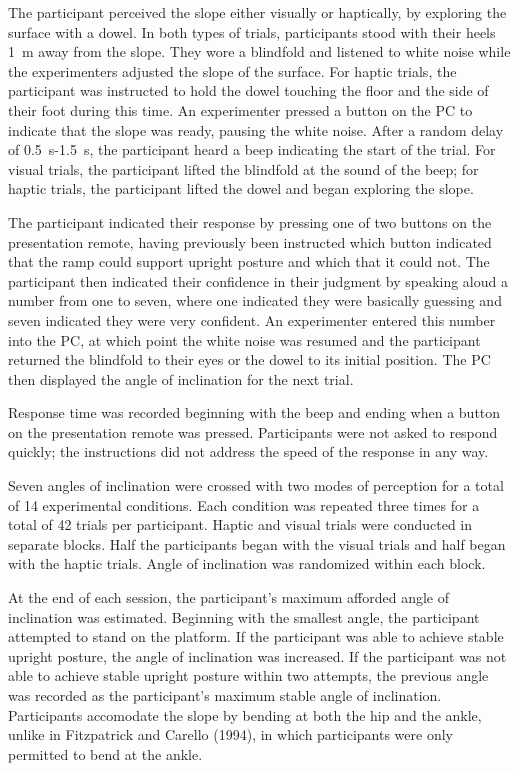 \documentclass{article}
\begin{document}
The participant perceived the slope either visually or haptically, by exploring the surface with a dowel. In both types of trials, participants stood with their heels 1~m away from the slope. They wore a blindfold and listened to white noise while the experimenters adjusted the slope of the surface. For haptic trials, the participant was instructed to hold the dowel touching the floor and the side of their foot during this time. An experimenter pressed a button on the PC to indicate that the slope was ready, pausing the white noise. After a random delay of 0.5~s-1.5~s, the participant heard a beep indicating the start of the trial. For visual trials, the participant lifted the blindfold at the sound of the beep; for haptic trials, the participant lifted the dowel and began exploring the slope.

The participant indicated their response by pressing one of two buttons on the presentation remote, having previously been instructed which button indicated that the ramp could support upright posture and which that it could not. The participant then indicated their confidence in their judgment by speaking aloud a number from one to seven, where one indicated they were basically guessing and seven indicated they were very confident. An experimenter entered this number into the PC, at which point the white noise was resumed and the participant returned the blindfold to their eyes or the dowel to its initial position. The PC then displayed the angle of inclination for the next trial.

Response time was recorded beginning with the beep and ending when a button on the presentation remote was pressed. Participants were not asked to respond quickly; the instructions did not address the speed of the response in any way.

Seven angles of inclination were crossed with two modes of perception for a total of 14 experimental conditions. Each condition was repeated three times for a total of 42 trials per participant. Haptic and visual trials were conducted in separate blocks. Half the participants began with the visual trials and half began with the haptic trials. Angle of inclination was randomized within each block.

At the end of each session, the participant's maximum afforded angle of inclination was estimated. Beginning with the smallest angle, the participant attempted to stand on the platform. If the participant was able to achieve stable upright posture, the angle of inclination was increased. If the participant was not able to achieve stable upright posture within two attempts, the previous angle was recorded as the participant's maximum stable angle of inclination. Participants accomodate the slope by bending at both the hip and the ankle, unlike in Fitzpatrick and Carello (1994), in which participants were only permitted to bend at the ankle.
\end{document}
